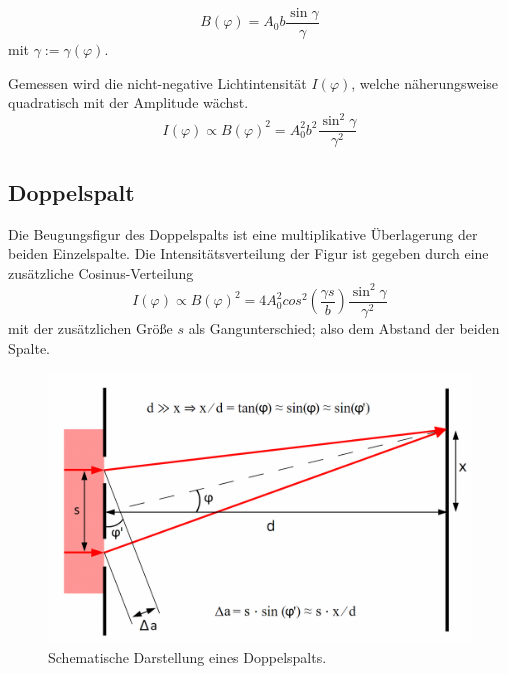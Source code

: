 \begin{equation}
  B(\varphi) = A_0b\frac{\sin{\gamma}}{\gamma}
\end{equation}
mit $\gamma := \gamma(\varphi)$.

Gemessen wird die nicht-negative Lichtintensität $I(\varphi)$, welche näherungsweise quadratisch mit der Amplitude wächst.
\begin{equation}
  I(\varphi) \propto B(\varphi)^2 = A_0^2b^2\frac{\sin^2{\gamma}}{\gamma^2}
  \label{eqn:I}
\end{equation}

\subsection{Doppelspalt}
Die Beugungsfigur des Doppelspalts ist eine multiplikative Überlagerung der beiden Einzelspalte.
Die Intensitätsverteilung der Figur ist gegeben durch eine zusätzliche Cosinus-Verteilung\cite{Versuchsanleitung}
\begin{equation}
  I(\varphi) \propto B(\varphi)^2 = 4A_0^2cos^2{(\frac{\gamma s}{b})}\frac{\sin^2{\gamma}}{\gamma^2}
  \label{eqn:doppelspalt}
\end{equation}
mit der zusätzlichen Größe $s$ als Gangunterschied; also dem Abstand der beiden Spalte.

\begin{figure}
  \centering
  \includegraphics[width=.9\textwidth]{plots/Doppelspalt.png}
  \caption{Schematische Darstellung eines Doppelspalts.\cite{DoppelspaltWiki}}
  \label{fig:schemDoppel}
\end{figure}

